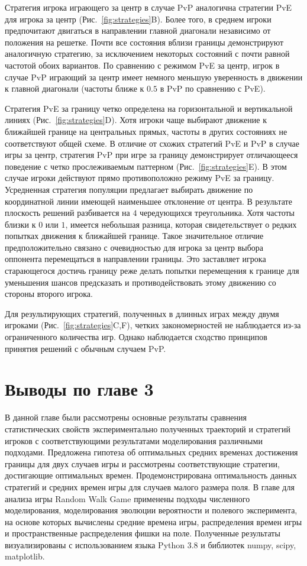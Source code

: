 Стратегия игрока играющего за центр в случае PvP аналогична стратегии PvE для игрока за центр (Рис.~\cref{fig:strategies}B). 
Более того, в среднем игроки предпочитают двигаться в направлении главной диагонали независимо от положения на решетке. 
Почти все состояния вблизи границы демонстрируют аналогичную стратегию, за исключением некоторых состояний с почти равной частотой обоих вариантов. 
По сравнению с режимом PvE за центр, игрок в случае PvP играющий за центр имеет немного меньшую уверенность в движении к главной диагонали 
(частоты ближе к $0.5$ в PvP по сравнению с PvE).

Стратегия PvE за границу четко определена на горизонтальной и вертикальной линиях (Рис.~\cref{fig:strategies}D). 
Хотя игроки чаще выбирают движение к ближайшей границе на центральных прямых, частоты в других состояниях не соответствуют общей схеме. 
В отличие от схожих стратегий PvE и PvP в случае игры за центр, стратегия PvP при игре за границу демонстрирует отличающееся поведение с четко прослеживаемым паттерном 
(Рис.~\cref{fig:strategies}E). 
В этом случае игроки действуют прямо противоположно режиму PvE за границу. Усредненная стратегия популяции предлагает выбирать движение 
по координатной линии имеющей наименьшее отклонение от центра. В результате плоскость решений разбивается на $4$ чередующихся треугольника. 
Хотя частоты близки к $0$ или $1$, имеется небольшая разница, которая свидетельствует о редких попытках движения к ближайшей границе.
Такое значительное отличие предположительно связано с очевидностью для игрока за центр выбора оппонента перемещаться в направлении границы.
Это заставляет игрока старающегося достичь границу реже делать попытки перемещения к границе для уменьшения шансов предсказать и противодействовать этому движению
со стороны второго игрока.

Для результирующих стратегий, полученных в длинных играх между двумя игроками (Рис.~\cref{fig:strategies}C,F), 
четких закономерностей не наблюдается из-за ограниченного количества игр. 
Однако наблюдается сходство принципов принятия решений с обычным случаем PvP.


\section{Выводы по главе 3}\label{sec:ch3/sec6}

В данной главе были рассмотрены основные результаты сравнения статистических свойств экспериментально
полученных траекторий и стратегий игроков с соответствующими результатами моделирования различными подходами. 
Предложена гипотеза об оптимальных средних временах достижения границы для двух случаев игры и 
рассмотрены соответствующие стратегии, достигающие оптимальных времен. Продемонстрирована оптимальность
данных стратегий и средних времен игры для случаев малого размера поля.
В главе для анализа игры Random Walk Game применены подходы численного моделирования, моделирования эволюции вероятности и полевого эксперимента,
на основе которых вычислены средние времена игры, распределения времен игры и пространственные распределения фишки на поле. 
Полученные результаты визуализированы с использованием языка Python 3.8 и библиотек numpy, scipy, matplotlib.

